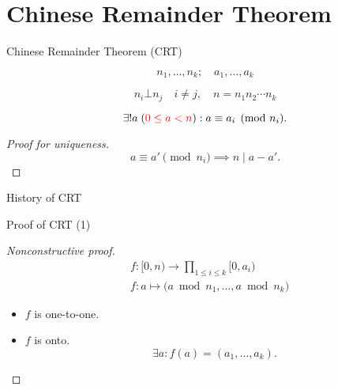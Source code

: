 \section{Chinese Remainder Theorem}

\begin{frame}{Chinese Remainder Theorem (CRT)}
  \begin{theorem}[CRT]
	\[
	  n_1, \ldots, n_k; \quad a_1, \ldots, a_k
	\]

	\[ 
	  n_i \bot n_j \quad i \neq j, \quad n = n_1n_2\cdots n_k 
	\]

    \[
	  \exists! a\; (\textcolor{red}{0 \le a < n}): a \equiv a_i \pmod{n_i}.
	\]
  \end{theorem}

  \begin{proof}[Proof for uniqueness]
	\[
	  a \equiv a' \pmod{n_i} \implies n \mid a - a'.
	\]
  \end{proof}
\end{frame}
\begin{frame}{History of CRT}
  \begin{quote}
  \end{quote}
\end{frame}
\begin{frame}{Proof of CRT (1)}
  \begin{proof}[Nonconstructive proof]
	\begin{align*}
	  &f: [0,n) \to \prod_{1 \le i \le k} [0,a_i) \\
	  &f: a \mapsto \big( a \bmod n_1, \dots, a \bmod n_k \big)
	\end{align*}

	\begin{itemize}
	  \item $f$ is one-to-one.
	  \item $f$ is onto.
		\[
		  \exists a: f(a) = (a_1, \dots, a_k).
		\]
	\end{itemize}
  \end{proof}
\end{frame}
